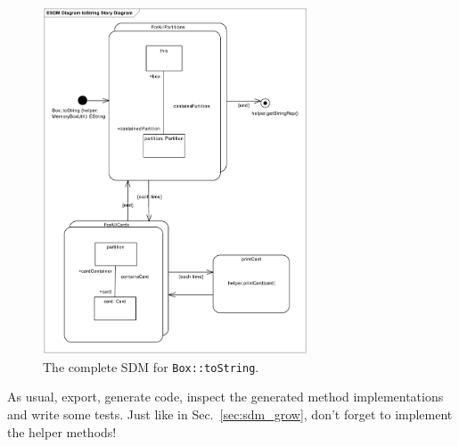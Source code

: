 \begin{figure}[htbp]
\begin{center}
  \includegraphics[width=0.7\textwidth]{pics/sdmBilder/toString/sdm76}
  \caption{The complete SDM for \texttt{Box::toString}.}  
  \label{fig:sdm_tostring_5}
\end{center}
\end{figure}

As usual, export, generate code, inspect the generated method implementations
and write some tests.  Just like in Sec.~\ref{sec:sdm_grow}, don't forget to
implement the helper methods!
